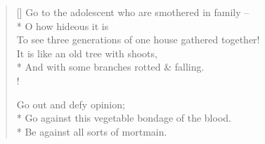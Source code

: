 \documentclass[MAIN]{subfiles}
\begin{document}
\begin{verse}[\versewidth]
Go to the adolescent who are smothered in family --\\*
O how hideous it is\\
To see three generations of one house gathered together!\\
It is like an old tree with shoots,\\*
And with some branches rotted \& falling.\\!

Go out and defy opinion;\\*
Go against this vegetable bondage of the blood.\\*
Be against all sorts of mortmain.
\end{verse}
\end{document}
